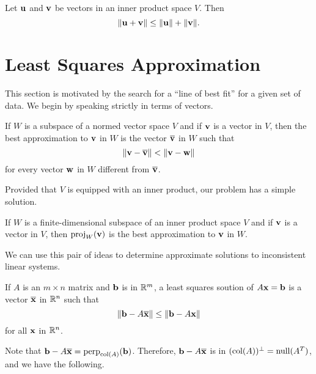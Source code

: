 \documentclass[../m73main.tex]{subfiles}
\begin{document}
\begin{theorem}
	Let $\mathbf{u}$ and $\mathbf{v}$ be vectors in an inner product space $V$.
	Then
	\[ \|\mathbf{u} + \mathbf{v}\| \leq \|\mathbf{u}\| + \|\mathbf{v}\|. \]
\end{theorem}

\section{Least Squares Approximation}
This section is motivated by the search for a ``line of best fit'' for a given set of data.
We begin by speaking strictly in terms of vectors.

\begin{definition}
	If $W$ is a subspace of a normed vector space $V$ and if $\mathbf{v}$ is a vector in $V$, then the best approximation to $\mathbf{v}$ in $W$ is the vector $\overline{\mathbf{v}}$ in $W$ such that
	\[ \|\mathbf{v} - \overline{\mathbf{v}}\| < \|\mathbf{v} - \mathbf{w}\| \]
	for every vector $\mathbf{w}$ in $W$ different from $\overline{\mathbf{v}}$.
\end{definition}

Provided that $V$ is equipped with an inner product, our problem has a simple solution.

\begin{theorem}
	If $W$ is a finite-dimensional subspace of an inner product space $V$ and if $\mathbf{v}$ is a vector in $V$, then $\textrm{proj}_W(\mathbf{v})$ is the best approximation to $\mathbf{v}$ in $W$.
\end{theorem}

We can use this pair of ideas to determine approximate solutions to inconsistent linear systems.

\begin{definition}
	If $A$ is an $m \times n$ matrix and $\mathbf{b}$ is in $\mathbb{R}^m$, a least squares soution of $A \mathbf{x} = \mathbf{b}$ is a vector $\overline{\mathbf{x}}$ in $\mathbb{R}^n$ such that
	\[ \|\mathbf{b} - A \overline{\mathbf{x}}\| \leq \|\mathbf{b} - A \mathbf{x}\| \]
	for all $\mathbf{x}$ in $\mathbb{R}^n$.
\end{definition}

Note that $\mathbf{b} - A \overline{\mathbf{x}} = \textrm{perp}_{\textrm{col}(A)}(\mathbf{b})$.
Therefore, $\mathbf{b} - A \overline{\mathbf{x}}$ is in $(\textrm{col}(A))^\perp = \textrm{null}(A^T)$, and we have the following.
\end{document}
